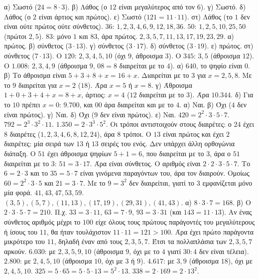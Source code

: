  α) Σωστό ($24=8\cdot 3$). β) Λάθος (ο $12$ είναι μεγαλύτερος από τον $6$). γ) Σωστό. δ) Λάθος (ο $2$ είναι άρτιος και πρώτος). ε) Σωστό ($121=11\cdot 11$). στ) Λάθος (το $1$ δεν είναι ούτε πρώτος ούτε σύνθετος).
 $36$: $1,2,3,4,6,9,12,18,36$. $50$: $1,2,5,10,25,50$ (πρώτοι $2,5$). $83$: μόνο $1$ και $83$, άρα πρώτος.
 $2,3,5,7,11,13,17,19,23,29$.
 α) πρώτος. β) σύνθετος ($3\cdot 13$). γ) σύνθετος ($3\cdot 17$). δ) σύνθετος ($3\cdot 19$). ε) πρώτος. στ) σύνθετος ($7\cdot 13$).
 Ο $120$: $2,3,4,5,10$ (όχι $9$, άθροισμα $3$). Ο $345$: $3,5$ (άθροισμα $12$). Ο $1.008$: $2,3,4,9$ (άθροισμα $9$, $08=8$ διαιρείται με το $4$).
 α) $640$, το ψηφίο είναι $0$. β) Το άθροισμα είναι $5+3+8+x=16+x$. Διαιρείται με το $3$ για $x=2,5,8$. Με το $9$ διαιρείται για $x=2$ ($18$). Άρα $x=5$ ή $x=8$. γ) Άθροισμα $1+0+3+4+x=8+x$, άρτιος: $x=4$ ($12$ διαιρείται με το $3$). Άρα $10.344$. δ) Για το $10$ πρέπει $x=0$: $9.700$, και $00$ άρα διαιρείται και με το $4$.
 α) Ναι. β) Όχι ($4$ δεν είναι πρώτος). γ) Ναι. δ) Όχι ($9$ δεν είναι πρώτος). ε) Ναι.
 $420=2^2\cdot 3\cdot 5\cdot 7$. $792=2^3\cdot 3^2\cdot 11$. $1.350=2\cdot 3^3\cdot 5^2$.
 Οι τρόποι αντιστοιχούν στους διαιρέτες: ο $24$ έχει $8$ διαιρέτες ($1,2,3,4,6,8,12,24$), άρα $8$ τρόποι. Ο $13$ είναι πρώτος και έχει $2$ διαιρέτες: μία σειρά των $13$ ή $13$ σειρές του ενός. Δεν υπάρχει άλλη ορθογώνια διάταξη.
 Ο $51$ έχει άθροισμα ψηφίων $5+1=6$, που διαιρείται με το $3$, άρα ο $51$ διαιρείται με το $3$: $51=3\cdot 17$. Άρα είναι σύνθετος.
 Ο αριθμός είναι $2\cdot2\cdot 3\cdot 5\cdot 7$. Το $6=2\cdot 3$ και το $35=5\cdot 7$ είναι γινόμενα παραγόντων του, άρα τον διαιρούν. Ομοίως $60=2^2\cdot 3\cdot 5$ και $21=3\cdot 7$. Με το $9=3^2$ δεν διαιρείται, γιατί το $3$ εμφανίζεται μόνο μία φορά.
 $41,43,47,53,59$.
 $(3,5),(5,7),(11,13),(17,19),(29,31),(41,43)$.
 α) $8\cdot 3\cdot 7=168$. β) Ο $2\cdot 3\cdot 5\cdot 7=210$.
 Π.χ. $33=3\cdot 11$, $63=7\cdot 9$, $93=3\cdot 31$ (και $143=11\cdot 13$).
 Αν ένας σύνθετος αριθμός μέχρι το $100$ είχε όλους τους πρώτους παράγοντές του μεγαλύτερους ή ίσους του $11$, θα ήταν τουλάχιστον $11\cdot 11=121>100$. Άρα έχει πρώτο παράγοντα μικρότερο του $11$, δηλαδή έναν από τους $2,3,5,7$. Έτσι τα πολλαπλάσια των $2,3,5,7$ αρκούν.
 $6.030$: με $2,3,5,9,10$ (άθροισμα $9$, όχι με το $4$ γιατί $30:4$ δεν είναι τέλεια). $2.800$: με $2,4,5,10$ (άθροισμα $10$, όχι με $3$ ή $9$). $4.617$: με $3,9$ (άθροισμα $18$), όχι με $2,4,5,10$.
 $325=5\cdot 65=5\cdot 5\cdot 13=5^2\cdot 13$. $338=2\cdot 169=2\cdot 13^2$.
